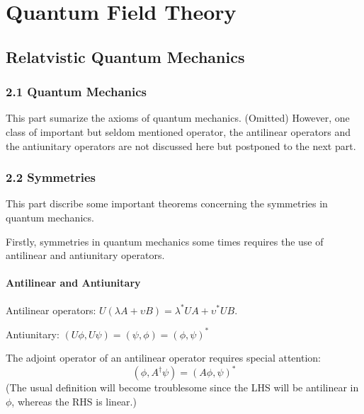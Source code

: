 \documentclass{article}
\numberwithin{equation}{subsection} %
\theoremstyle{definition}
\begin{document}
    

\section{Quantum Field Theory}
\label{sec:Quantum_Field_Theory}
    \subsection{Relatvistic Quantum Mechanics}
    \label{sec:Relatvistic_Quantum_Mechanics}

    \subsubsection{2.1 Quantum Mechanics}
    \label{sec:2.1_Quantum_Mechanics}
    This part sumarize the axioms of quantum mechanics. (Omitted)
    However, one class of important but seldom mentioned operator,
    the antilinear operators and the antiunitary operators are not
    discussed here but postponed to the next part.

    \subsubsection{2.2 Symmetries}
    \label{sec:2.2_Symmetries}
    This part discribe some important theorems concerning the symmetries
    in quantum mechanics.

    Firstly, symmetries in quantum mechanics some times requires the use
    of antilinear and antiunitary operators.

    \paragraph{Antilinear and Antiunitary}
    Antilinear operators: $U (\lambda A + \upsilon B)
                            = \lambda^* UA + \upsilon^* UB$.

    Antiunitary: $ (U \phi, U \psi) = (\psi, \phi) = (\phi,\psi)^*$

    The adjoint operator of an antilinear operator requires special
    attention:
    $$ (\phi, A^\dagger\psi) = (A\phi, \psi)^*$$
    (The usual definition will become troublesome since the LHS will
    be antilinear in $\phi$, whereas the RHS is linear.)
\end{document}
